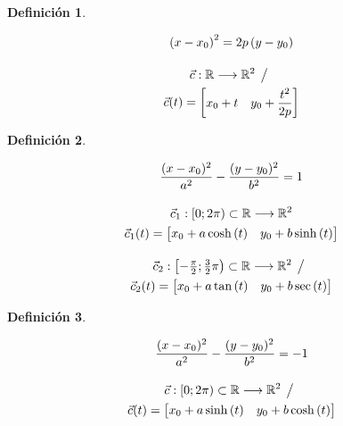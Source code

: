 \documentclass[a5paper,12pt,twoside]{book}
\newtheorem{defn}{{Definición}}[chapter]
\begin{document}
\begin{mdframed}[style=MyFrame1]
    \begin{defn}
    \end{defn}
    \begin{gather*}
        \left(x-x_0\right)^2=2p\left(y-y_0\right)
        \\[1em]
        \Vec{c}:\mathbb{R} \longrightarrow \mathbb{R}^2 \hspace{1ex} \big/ \hspace{1ex}
        \\
        \Vec{c}(t) = \begin{bmatrix} x_0 + t & y_0 + \dfrac{t^2}{2p} \end{bmatrix}
    \end{gather*}
\end{mdframed}

\begin{mdframed}[style=MyFrame1]
    \begin{defn}
    \end{defn}
    \begin{gather*}
        \dfrac{(x-x_0)^2}{a^2}-\dfrac{(y-y_0)^2}{b^2}=1
        \\[1em]
        \Vec{c}_1:[0;2 \pi) \subset \mathbb{R} \longrightarrow \mathbb{R}^2
        \\
        \Vec{c}_1(t) = \begin{bmatrix} x_0 + a\cosh{(t)} & y_0 + b\sinh{(t)} \end{bmatrix}
        \\[1em]
        \Vec{c}_2:\left[-\tfrac{\pi}{2}; \tfrac{3}{2} \pi\right) \subset \mathbb{R} \longrightarrow \mathbb{R}^2 \hspace{1ex} \big/ \hspace{1ex}
        \\
        \Vec{c}_2(t)= \begin{bmatrix} x_0 + a\tan{(t)} & y_0 + b\sec{(t)} \end{bmatrix}
    \end{gather*}
\end{mdframed}

\begin{mdframed}[style=MyFrame1]
    \begin{defn}
    \end{defn}
    \begin{gather*}
        \dfrac{(x-x_0)^2}{a^2}-\dfrac{(y-y_0)^2}{b^2}=-1
        \\[1em]
        \Vec{c}:[0;2 \pi) \subset \mathbb{R} \longrightarrow \mathbb{R}^2 \hspace{1ex} \big/ \hspace{1ex}
        \\
        \Vec{c}(t)= \begin{bmatrix} x_0 + a\sinh{(t)} & y_0 + b\cosh{(t)} \end{bmatrix}
    \end{gather*}
\end{mdframed}
\end{document}
